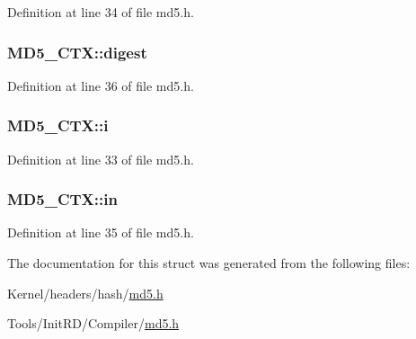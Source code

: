 Definition at line 34 of file md5.h.

\hypertarget{structMD5__CTX_a3fd397dba8ec1fbab19a46ac97fa131e}{
\subsubsection[{digest}]{ {\bf MD5\_\-CTX::digest}}}
\label{structMD5__CTX_a3fd397dba8ec1fbab19a46ac97fa131e}


Definition at line 36 of file md5.h.

\hypertarget{structMD5__CTX_a390f9af4ccdea5b2b06a198d3fbcb3be}{
\subsubsection[{i}]{ {\bf MD5\_\-CTX::i}}}
\label{structMD5__CTX_a390f9af4ccdea5b2b06a198d3fbcb3be}


Definition at line 33 of file md5.h.

\hypertarget{structMD5__CTX_aed4b3af3540834b37fc5d6909eefec96}{
\subsubsection[{in}]{ {\bf MD5\_\-CTX::in}}}
\label{structMD5__CTX_aed4b3af3540834b37fc5d6909eefec96}


Definition at line 35 of file md5.h.



The documentation for this struct was generated from the following files:\begin{DoxyCompactItemize}
\item 
Kernel/headers/hash/\hyperlink{Kernel_2headers_2hash_2md5_8h}{md5.h}\item 
Tools/InitRD/Compiler/\hyperlink{Tools_2InitRD_2Compiler_2md5_8h}{md5.h}\end{DoxyCompactItemize}
